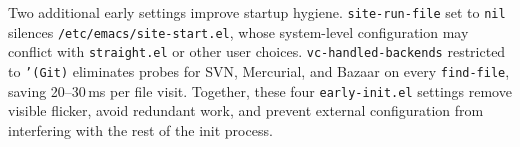 Two additional early settings improve startup hygiene.  \texttt{site-run-file} set to \texttt{nil} silences \texttt{/etc/emacs/site-start.el}, whose system-level configuration may conflict with \texttt{straight.el} or other user choices.  \texttt{vc-handled-backends} restricted to \texttt{'(Git)} eliminates probes for SVN, Mercurial, and Bazaar on every \texttt{find-file}, saving 20--30\,ms per file visit.  Together, these four \texttt{early-init.el} settings remove visible flicker, avoid redundant work, and prevent external configuration from interfering with the rest of the init process.
